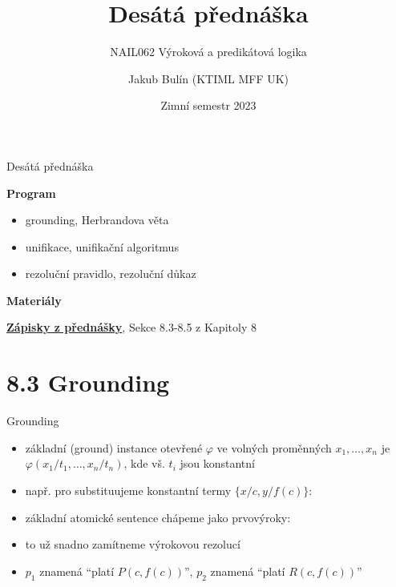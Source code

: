 \documentclass{beamer}
\title{Desátá přednáška}
\subtitle{NAIL062 Výroková a predikátová logika}
\author{Jakub Bulín (KTIML MFF UK)}
\date{Zimní semestr 2023}
\begin{document}
\frame{\titlepage}


\begin{frame}{Desátá přednáška}

    \textbf{Program}
        \begin{itemize}
            \item grounding, Herbrandova věta
            \item unifikace, unifikační algoritmus
            \item rezoluční pravidlo, rezoluční důkaz
        \end{itemize}    

    \textbf{Materiály}

        \href{https://github.com/jbulin-mff-uk/nail062/raw/main/lecture/lecture-notes/lecture-notes.pdf}{\alert{\textbf{Zápisky z přednášky}}}, Sekce 8.3-8.5 z Kapitoly 8

\end{frame}


\section{8.3 Grounding}


\begin{frame}{Grounding}

    \begin{itemize}
        \item \alert{základní (ground) instance} otevřené $\varphi$ ve volných proměnných $x_1,\dots,x_n$ je $\varphi(x_1/t_1,\dots,x_n/t_n)$, kde vš. $t_i$ jsou konstantní
        
        \bigskip
        
        
        \bigskip
        \item např. pro  substituujeme \alert{konstantní} termy $\{x/c,y/f(c)\}$:
        

        \item základní atomické sentence chápeme jako prvovýroky: 
        

        \item to už snadno zamítneme výrokovou rezolucí
        \item $p_1$ znamená ``platí $P(c,f(c))$'', $p_2$ znamená ``platí $R(c,f(c))$''        
    \end{itemize}
    
\end{frame}
\end{document}
